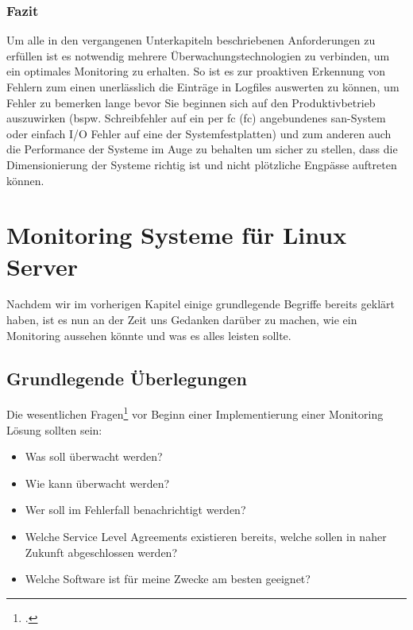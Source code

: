 \documentclass[12pt,a4paper,parskip,listof=totoc,bibliography=totoc]{scrreprt}
\begin{document}
	\subsection{Fazit}
	Um alle in den vergangenen Unterkapiteln beschriebenen Anforderungen zu erfüllen ist es notwendig mehrere Überwachungstechnologien zu verbinden, um ein optimales Monitoring zu erhalten. So ist es zur proaktiven Erkennung von Fehlern zum einen unerlässlich die Einträge in Logfiles auswerten zu können, um Fehler zu bemerken lange bevor Sie beginnen sich auf den Produktivbetrieb auszuwirken (bspw. Schreibfehler auf ein per \acrlong{fc} (\acrshort{fc}) angebundenes \acrshort{san}-System oder einfach I/O Fehler auf eine der Systemfestplatten) und zum anderen auch die Performance der Systeme im Auge zu behalten um sicher zu stellen, dass die Dimensionierung der Systeme richtig ist und nicht plötzliche Engpässe auftreten können.
	\chapter{Monitoring Systeme für Linux Server}

	Nachdem wir im vorherigen Kapitel einige grundlegende Begriffe bereits geklärt haben, ist es nun an der Zeit uns Gedanken darüber zu machen, wie ein Monitoring aussehen könnte und was es alles leisten sollte. 
	\section{Grundlegende Überlegungen}
	Die wesentlichen Fragen\footcite[nach][]{veltnagios1} vor Beginn einer Implementierung einer Monitoring Lösung sollten sein:
	\begin{itemize}
		\item Was soll überwacht werden?
		\item Wie kann überwacht werden?
		\item Wer soll im Fehlerfall benachrichtigt werden?
		\item Welche Service Level Agreements existieren bereits, welche sollen in naher Zukunft abgeschlossen werden?
		\item Welche Software ist für meine Zwecke am besten geeignet?
	\end{itemize}
\end{document}

